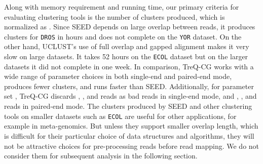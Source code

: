 \documentclass[a4paper]{article}
\begin{document}
Along with memory requirement and running time, our primary criteria for
evaluating clustering tools is the number of clusters produced, which
is normalized as .
Since SEED depends on large overlap between reads, it produces 
clusters for {\tt DROS} in  hours and does not complete on the
{\tt YOR} dataset. On the other hand, UCLUST's use of full overlap
and gapped alignment makes it very slow on large datasets.
It takes 52 hours on the {\tt ECOL} dataset but on the larger datasets
it did not complete in one week. In comparison,
TreQ-CG
works with a wide
range of parameter choices in both single-end and paired-end mode,
produces fewer clusters, and runs faster than SEED.
Additionally, for parameter set , TreQ-CG discards
, , and
 reads as bad reads in single-end mode, and , , and
 reads in paired-end mode.
The clusters
produced by SEED and other clustering tools on smaller datasets such as
{\tt ECOL} are useful for other applications, for example in meta-genomics.
But unless they support smaller overlap length, which is difficult for their
particular choice of data structures and algorithms, they will not be
attractive choices for pre-processing reads before read mapping.
We do not consider them for subsequent analysis in the following section.
\end{document}
